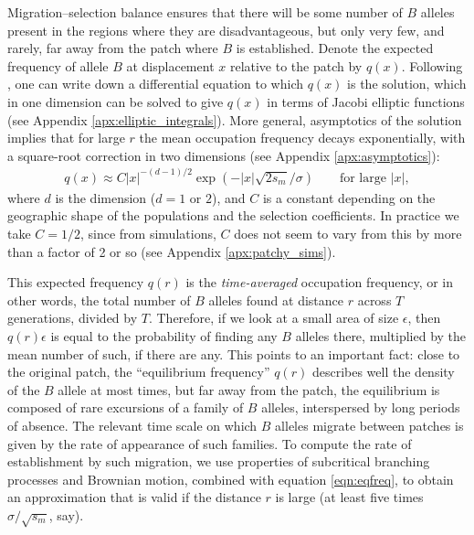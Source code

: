 \documentclass{article}
\begin{document}
Migration--selection balance ensures that 
there will be some number of $B$ alleles present in the regions where they are disadvantageous,
but only very few, and rarely, far away from the patch where $B$ is established.
Denote the expected frequency of allele $B$ at displacement $x$ relative to the patch by $q(x)$.
Following \citet{slatkin1973geneflow}, one can write down a differential equation to which $q(x)$ is the solution,
which in one dimension can be solved to give $q(x)$ in terms of Jacobi elliptic functions (see Appendix \ref{apx:elliptic_integrals}).
More general, asymptotics of the solution implies that for large $r$ the mean occupation frequency decays exponentially, with a square-root correction in two dimensions (see Appendix \ref{apx:asymptotics}): 
\begin{align} \label{eqn:eqfreq}
    q(x) \approx C |x|^{-(d-1)/2} \exp( - |x| \sqrt{2 s_m} / \sigma) \qquad \text{for large $|x|$},
\end{align}
where $d$ is the dimension ($d=1$ or $2$), and $C$ is a constant depending on the geographic shape of the populations and the selection coefficients. 
In practice we take $C=1/2$,
since from simulations, $C$ does not seem to vary from this by more than a factor of 2 or so (see Appendix \ref{apx:patchy_sims}).

This expected frequency $q(r)$ is the \emph{time-averaged} occupation frequency,
or in other words, the total number of $B$ alleles found at distance $r$ across $T$ generations, divided by $T$.
Therefore, if we look at a small area of size $\epsilon$, 
then $q(r) \epsilon$ is equal to the probability of finding any $B$ alleles there,
multiplied by the mean number of such, if there are any.
This points to an important fact: 
close to the original patch, the ``equilibrium frequency'' $q(r)$ describes well the density of the $B$ allele at most times,
but far away from the patch, 
the equilibrium is composed of rare excursions of a family of $B$ alleles, interspersed by long periods of absence.
The relevant time scale on which $B$ alleles migrate between patches is given by the rate of appearance of such families.
To compute the rate of establishment by such migration,
we use properties of subcritical branching processes and Brownian motion,
combined with equation \eqref{eqn:eqfreq},
to obtain an approximation that is valid if the distance $r$ is large (at least five times $\sigma/\sqrt{s_m}$, say).
\end{document}
